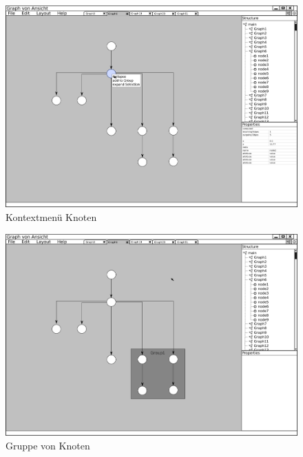 \begin{figure}[ht]
  \centering
  \includegraphics[width=380pt]{resourcen/gui_view_nodeMenu.png}
  \caption{Kontextmenü Knoten}
  \label{fig:gui_view_nodeMenu}
\end{figure}

\begin{figure}[ht]
  \centering
  \includegraphics[width=380pt]{resourcen/gui_view_group.png}
  \caption{Gruppe von Knoten}
  \label{fig:gui_view_group}
\end{figure}

